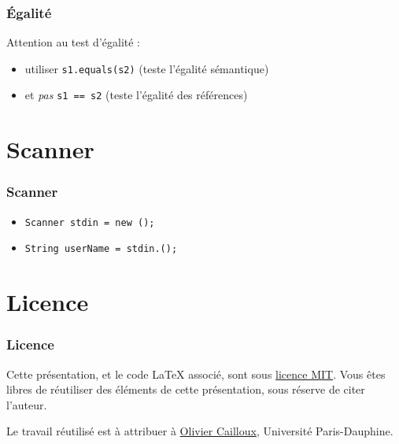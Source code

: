 \documentclass[english, french]{beamer}
\begin{document}
\begin{frame}
	\frametitle{Égalité}
	Attention au test d’égalité :
	\begin{itemize}
		\item[\mkkOK] utiliser \texttt{s1.equals(s2)} (teste l’égalité sémantique)
		\item[\mkkNO] et \emph{pas} \texttt{s1 == s2} (teste l’égalité des références)
	\end{itemize}
\end{frame}

\section{Scanner}
\begin{frame}
	\frametitle{Scanner}
	\begin{itemize}
		\item \texttt{Scanner stdin = new ();}
		\item \texttt{String userName = stdin.();}
	\end{itemize}
\end{frame}

\appendix

\section{Licence}
\begin{frame}
	\frametitle{Licence}
	Cette présentation, et le code LaTeX associé, sont sous \href{https://opensource.org/licenses/MIT}{licence MIT}. Vous êtes libres de réutiliser des éléments de cette présentation, sous réserve de citer l’auteur.
	
	Le travail réutilisé est à attribuer à \href{https://www.lamsade.dauphine.fr/~ocailloux/}{Olivier Cailloux}, Université Paris-Dauphine.
\end{frame}
\end{document}

